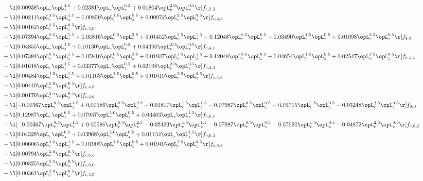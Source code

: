 \begin{alignat}{2}
& - \l[  0.00938 \opL_r \opL_z^{1.5} +  0.02381 \opL_r \opL_z^{0.5} +  0.01804 \opL_r^{2.0} \opL_z^{0.5}  \r] f_{c,2,3} \nonumber \\ 
& + \l[  0.00211 \opL_r^{1.5} \opL_z^{1.5} +  0.00859 \opL_r^{1.5} \opL_z^{0.5} +  0.00972 \opL_r^{2.5} \opL_z^{0.5}  \r] f_{c,2,4} \nonumber \\ 
& + \l[  0.00162 \opL_r^{2.5} \opL_z^{0.5}  \r] f_{c,2,6} \nonumber \\ 
& + \l[  0.07394 \opL_r^{0.5} \opL_z^{1.5} +  0.05816 \opL_r^{0.5} \opL_z^{2.5} +  0.01452 \opL_r^{1.5} \opL_z^{1.5} +  0.12048 \opL_r^{0.5} \opL_z^{0.5} +  0.03490 \opL_r^{1.5} \opL_z^{0.5} +  0.01698 \opL_r^{2.5} \opL_z^{0.5}  \r] f_{4,0} \nonumber \\ 
& - \l[  0.04855 \opL_r \opL_z^{1.5} +  0.10130 \opL_r \opL_z^{0.5} +  0.04396 \opL_r^{2.0} \opL_z^{0.5}  \r] f_{c,4,1} \nonumber \\ 
& + \l[  0.07394 \opL_r^{0.5} \opL_z^{1.5} +  0.05816 \opL_r^{0.5} \opL_z^{2.5} +  0.01937 \opL_r^{1.5} \opL_z^{1.5} +  0.12048 \opL_r^{0.5} \opL_z^{0.5} +  0.04654 \opL_r^{1.5} \opL_z^{0.5} +  0.02547 \opL_r^{2.5} \opL_z^{0.5}  \r] f_{c,4,2} \nonumber \\ 
& - \l[  0.01618 \opL_r \opL_z^{1.5} +  0.03377 \opL_r \opL_z^{0.5} +  0.02198 \opL_r^{2.0} \opL_z^{0.5}  \r] f_{c,4,3} \nonumber \\ 
& + \l[  0.00484 \opL_r^{1.5} \opL_z^{1.5} +  0.01163 \opL_r^{1.5} \opL_z^{0.5} +  0.01019 \opL_r^{2.5} \opL_z^{0.5}  \r] f_{c,4,4} \nonumber \\ 
& - \l[  0.00440 \opL_r^{2.0} \opL_z^{0.5}  \r] f_{c,4,5} \nonumber \\ 
& + \l[  0.00170 \opL_r^{2.5} \opL_z^{0.5}  \r] f_{c,4,6} \nonumber \\ 
& + \l[  -0.00367 \opL_r^{0.5} \opL_z^{1.5} +  0.00586 \opL_r^{0.5} \opL_z^{2.5}   -0.01817 \opL_r^{1.5} \opL_z^{1.5}   -0.07987 \opL_r^{0.5} \opL_z^{0.5}   -0.05715 \opL_r^{1.5} \opL_z^{0.5}   -0.03248 \opL_r^{2.5} \opL_z^{0.5}  \r] f_{6,0} \nonumber \\ 
& + \l[  0.12987 \opL_r \opL_z^{0.5} +  0.07937 \opL_r^{2.0} \opL_z^{0.5} +  0.03463 \opL_r \opL_z^{1.5}  \r] f_{c,6,1} \nonumber \\ 
& + \l[  -0.00367 \opL_r^{0.5} \opL_z^{1.5} +  0.00586 \opL_r^{0.5} \opL_z^{2.5}   -0.02423 \opL_r^{1.5} \opL_z^{1.5}   -0.07987 \opL_r^{0.5} \opL_z^{0.5}   -0.07620 \opL_r^{1.5} \opL_z^{0.5}   -0.04872 \opL_r^{2.5} \opL_z^{0.5}  \r] f_{c,6,2} \nonumber \\ 
& + \l[  0.04329 \opL_r \opL_z^{0.5} +  0.03968 \opL_r^{2.0} \opL_z^{0.5} +  0.01154 \opL_r \opL_z^{1.5}  \r] f_{c,6,3} \nonumber \\ 
& - \l[  0.00606 \opL_r^{1.5} \opL_z^{1.5} +  0.01905 \opL_r^{1.5} \opL_z^{0.5} +  0.01949 \opL_r^{2.5} \opL_z^{0.5}  \r] f_{c,6,4} \nonumber \\ 
& + \l[  0.00794 \opL_r^{2.0} \opL_z^{0.5}  \r] f_{c,6,5} \nonumber \\ 
& - \l[  0.00325 \opL_r^{2.5} \opL_z^{0.5}  \r] f_{c,6,6} \nonumber \\ 
& - \l[  0.00361 \opL_r^{2.0} \opL_z^{0.5}  \r] f_{c,2,5} \nonumber \\ 
\end{alignat} 
